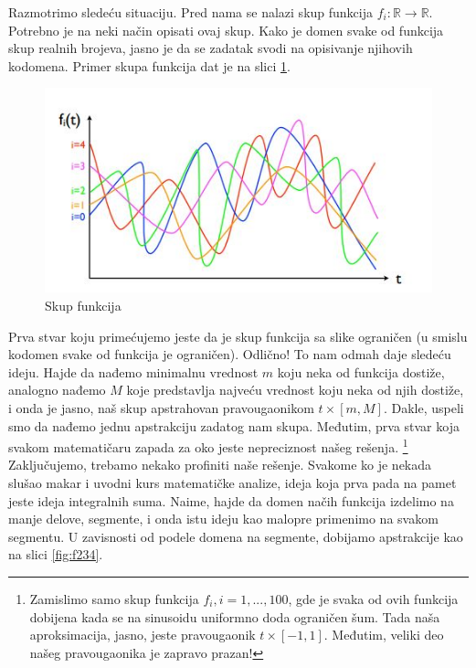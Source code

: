 \documentclass[a4paper]{article}
\newcommand*{\field}[1]{\mathbb{#1}} %
\begin{document}
Razmotrimo sledeću situaciju. Pred nama se nalazi skup funkcija 
$f_i: \field{R} \rightarrow \field{R}.$ Potrebno je na neki način opisati ovaj skup. Kako je domen svake od funkcija skup realnih brojeva, jasno je da se zadatak svodi na opisivanje njihovih kodomena. Primer skupa funkcija dat je na slici \ref{fig:f1}.
\begin{figure}[h!]
\begin{center}
\includegraphics[scale=0.4]{f1.JPG}
\end{center}
\caption{Skup funkcija}
\label{fig:f1}
\end{figure} \newline
Prva stvar koju primećujemo jeste da je skup funkcija sa slike ograničen (u smislu kodomen svake od funkcija je ograničen). Odlično! To nam odmah daje sledeću ideju. Hajde da nađemo minimalnu vrednost $m$ koju neka od funkcija dostiže, analogno nađemo $M$ koje predstavlja najveću vrednost koju neka od njih dostiže, i onda je jasno, naš skup apstrahovan pravougaonikom $t \times [m, M]$. \newline
Dakle, uspeli smo da nađemo jednu apstrakciju zadatog nam skupa. Međutim, prva stvar koja svakom matematičaru zapada za oko jeste nepreciznost našeg rešenja. \footnote{Zamislimo samo skup funkcija $f_i, i=1,...,100$, gde je svaka od ovih funkcija dobijena kada se na sinusoidu uniformno doda ograničen šum. Tada naša aproksimacija, jasno, jeste pravougaonik $t \times [-1,1]$. Međutim, veliki deo našeg pravougaonika je zapravo prazan!} Zaključujemo, trebamo nekako profiniti naše rešenje. \newline
Svakome ko je nekada slušao makar i uvodni kurs matematičke analize, ideja koja prva pada na pamet jeste ideja integralnih suma. Naime, hajde da domen načih funkcija izdelimo na manje delove, segmente, i onda istu ideju kao malopre primenimo na svakom segmentu. U zavisnosti od podele domena na segmente, dobijamo apstrakcije kao na slici \ref{fig:f234}.
\end{document}
